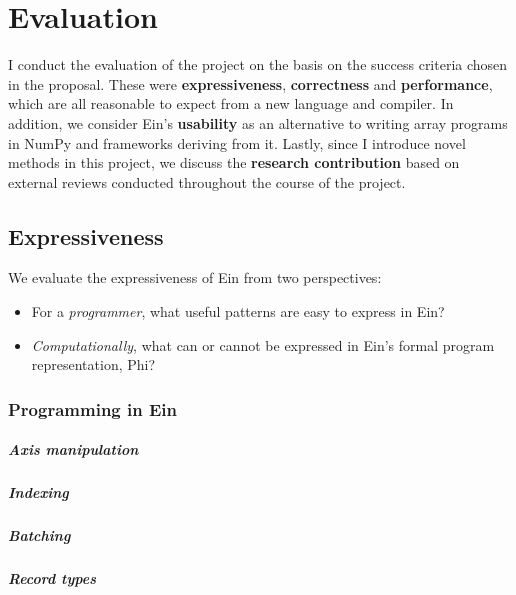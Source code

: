 \chapter{Evaluation}

I conduct the evaluation of the project on the basis on the success criteria chosen in the proposal.
These were \textbf{expressiveness}, \textbf{correctness} and \textbf{performance}, which are all reasonable to expect from a new language and compiler. 
In addition, we consider Ein's \textbf{usability} as an alternative to writing array programs in NumPy and frameworks deriving from it.
Lastly, since I introduce novel methods in this project, we discuss the \textbf{research contribution} based on external reviews conducted throughout the course of the project.

\section{Expressiveness}

We evaluate the expressiveness of Ein from two perspectives: \begin{itemize}
    \item For a \textit{programmer}, what useful patterns are easy to express in Ein?
    \item \textit{Computationally}, what can or cannot be expressed in Ein's formal program representation, Phi?
\end{itemize}

\subsection{Programming in Ein}

\paragraph{Axis manipulation}

\paragraph{Indexing}

\paragraph{Batching}

\paragraph{Record types}

